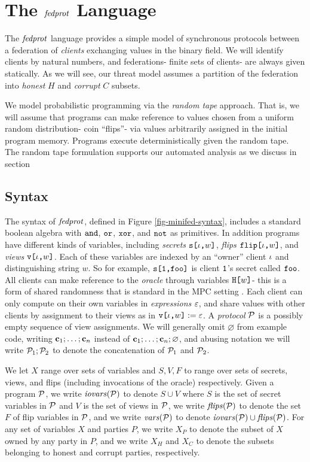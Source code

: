 \section{The $\mathit{fedprot}$ Language}

The $\mathit{fedprot}$ language provides a simple model of synchronous
protocols between a federation of \emph{clients} exchanging values in
the binary field. We will identify clients by natural numbers, and
federations- finite sets of clients- are always given statically.
As we will see, our threat model assumes a partition of the federation
into \emph{honest} $H$ and \emph{corrupt} $C$ subsets.

We model probabilistic programming via the \emph{random tape}
approach. That is, we will assume that programs can make reference to
values chosen from a uniform random distribution- coin ``flips''- via
values arbitrarily assigned in the initial program memory.  Programs
execute deterministically given the random tape. The random tape
formulation supports our automated analysis as we discuss in
section 

\subsection{Syntax} The syntax of $\mathit{fedprot}$, defined in
Figure \ref{fig-minifed-syntax}, includes a standard boolean algebra
with $\texttt{and}$, $\texttt{or}$, $\texttt{xor}$, and $\texttt{not}$ as primitives. In addition
programs have different kinds of variables, including \emph{secrets}
$\texttt{s[}\iota\texttt{,}w\texttt{]}$, \emph{flips} $\texttt{flip[}\iota\texttt{,}w\texttt{]}$, and \emph{views}
$\texttt{v[}\iota\texttt{,}w\texttt{]}$.  Each of these variables are indexed by an ``owner''
client $\iota$ and distinguishing string $w$. So for example,
$\texttt{s[}\texttt{1}\texttt{,}\texttt{foo}\texttt{]}$ is client $\texttt{1}$'s secret called
$\texttt{foo}$. All clients can make reference to the \emph{oracle}
through variables $\texttt{H[}w\texttt{]}$- this is a form of shared randomness
that is standard in the MPC setting \cite{XXX}.  Each client can only
compute on their own variables in \emph{expressions} $\varepsilon$, and share
values with other clients by assignment to their views as in
$\texttt{v[}\iota\texttt{,}w\texttt{]} := \varepsilon$.  A \emph{protocol} $\mathcal{P}$ is a
possibly empty sequence of view assignments. We will generally omit
$\varnothing$ from example code, writing $\mathbf{c}_1;\ldots;\mathbf{c}_n$
instead of $\mathbf{c}_1;\ldots;\mathbf{c}_n;\varnothing$, and abusing notation we will
write $\mathcal{P}_1;\mathcal{P}_2$ to denote the concatenation of $\mathcal{P}_1$
and $\mathcal{P}_2$.

We let $X$ range over sets of variables and $S,V,F$ to range over sets
of secrets, views, and flips (including invocations of the oracle)
respectively. Given a program $\mathcal{P}$, we write $\mathit{iovars}(\mathcal{P})$ to
denote $S \cup V$ where $S$ is the set of secret variables in $\mathcal{P}$
and $V$ is the set of views in $\mathcal{P}$, we write $\mathit{flips}(\mathcal{P})$
to denote the set $F$ of flip variables in $\mathcal{P}$, and we
write $\mathit{vars}(\mathcal{P})$ to denote $\mathit{iovars}(\mathcal{P}) \cup \mathit{flips}(\mathcal{P})$. For any set of
variables $X$ and parties $P$, we write $X_P$ to denote the subset of
$X$ owned by any party in $P$, and we write $X_H$ and $X_C$ to denote
the subsets belonging to honest and corrupt parties, respectively.

